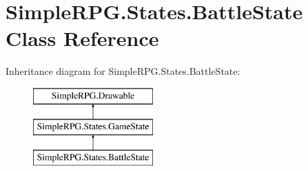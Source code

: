 \hypertarget{class_simple_r_p_g_1_1_states_1_1_battle_state}{\section{Simple\-R\-P\-G.\-States.\-Battle\-State Class Reference}
\label{class_simple_r_p_g_1_1_states_1_1_battle_state}
}
Inheritance diagram for Simple\-R\-P\-G.\-States.\-Battle\-State\-:\begin{figure}[H]
\begin{center}
\leavevmode
\includegraphics[height=3.000000cm]{class_simple_r_p_g_1_1_states_1_1_battle_state}
\end{center}
\end{figure}
